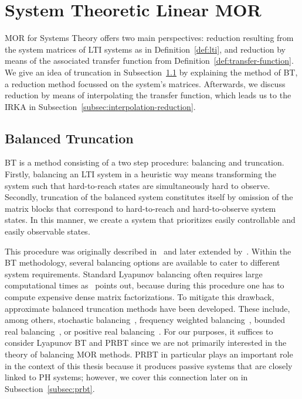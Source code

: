 \section{System Theoretic Linear MOR}\label{sec:system-mor}

\acl{MOR} for Systems Theory offers two main perspectives: reduction resulting from the system matrices of \ac{LTI} systems as in Definition~\ref{def:lti}, and reduction by means of the associated transfer function from Definition~\ref{def:transfer-function}.
We give an idea of truncation in Subsection~\ref{subsec:balanced-truncation} by explaining the method of \acf{BT}, a reduction method focussed on the system's matrices.
Afterwards, we discuss reduction by means of interpolating the transfer function, which leads us to the \acf{IRKA} in Subsection~\ref{subsec:interpolation-reduction}.

\subsection{Balanced Truncation}\label{subsec:balanced-truncation}

\acl{BT} is a method consisting of a two step procedure: balancing and truncation.
Firstly, balancing an \ac{LTI} system in a heuristic way means transforming the system such that hard-to-reach states are simultaneously hard to observe.
Secondly, truncation of the balanced system constitutes itself by omission of the matrix blocks that correspond to hard-to-reach and hard-to-observe system states.
In this manner, we create a system that prioritizes easily controllable and easily observable states.

This procedure was originally described in~\cite{Mullis1976} and later extended by~\cite{Moore1981, Enns1984}.
Within the \ac{BT} methodology, several balancing options are available to cater to different system requirements.
Standard Lyapunov balancing often requires large computational times as~\cite{Gugercin2007} points out, because during this procedure one has to compute expensive dense matrix factorizations.
To mitigate this drawback, approximate balanced truncation methods have been developed.
These include, among others, stochastic balancing~\cite{Desai1984, Green1988}, frequency weighted balancing~\cite{Enns1984, Wang1999}, bounded real balancing~\cite{Opdenacker1988, Reis2010}, or positive real balancing~\cite{Desai1984, Ober1991}.
For our purposes, it suffices to consider Lyapunov \ac{BT} and \ac{PRBT} since we are not primarily interested in the theory of balancing \ac{MOR} methods.
\ac{PRBT} in particular plays an important role in the context of this thesis because it produces passive systems that are closely linked to \ac{PH} systems; however, we cover this connection later on in Subsection~\ref{subsec:prbt}.

